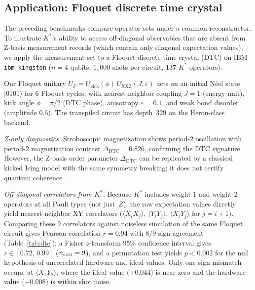 \documentclass[twocolumn,prx,aps,superscriptaddress,longbibliography,floatfix]{revtex4-2}
\begin{document}
\subsection{Application: Floquet discrete time crystal}
\label{sec:dtc}

The preceding benchmarks compare operator sets under a common
reconstructor.
To illustrate $K^*$'s ability to access off-diagonal
observables that are absent from Z-basis measurement records
(which contain only diagonal expectation values),
we apply the measurement set to a
Floquet discrete time crystal (DTC) on IBM
\texttt{ibm\_kingston} ($n = 4$ qubits, $1{,}000$ shots per
circuit, $137$ $K^*$ operators).

Our Floquet unitary $U_F = U_{\mathrm{kick}}(\phi)\,
U_{\mathrm{XXZ}}(J, \varepsilon)$ acts on an initial N\'eel
state $|0101\rangle$ for $6$ Floquet cycles, with nearest-neighbor coupling $J = 1$ (energy unit), kick angle
$\phi = \pi/2$ (DTC phase), anisotropy $\varepsilon = 0.1$,
and weak bond disorder (amplitude $0.5$).  The transpiled circuit
has depth~$329$ on the Heron-class backend.

\emph{Z-only diagnostics.}
Stroboscopic magnetization shows period-$2$ oscillation
with period-$2$ magnetization contrast $\Delta_{\mathrm{DTC}} = 0.826$, confirming the DTC
signature.  However, the Z-basis order parameter
$\Delta_{\mathrm{DTC}}$ can be replicated by a classical
kicked Ising model with the same symmetry breaking;
it does not certify quantum coherence~\cite{Mi2022,Ippoliti2021}.

\emph{Off-diagonal correlators from $K^*$.}
Because $K^*$ includes weight-$1$ and weight-$2$ operators
at all Pauli types (not just~$Z$), the raw expectation
values directly yield nearest-neighbor XY correlators
($\langle X_i X_j\rangle$, $\langle Y_i Y_j\rangle$,
$\langle X_i Y_j\rangle$ for $j = i + 1$).
Comparing these $9$ correlators against noiseless simulation
of the same Floquet circuit gives Pearson correlation
$r = 0.94$ with $8/9$ sign agreement
(Table~\ref{tab:dtc});
a Fisher $z$-transform $95\%$ confidence interval gives
$r \in [0.72,\, 0.99]$ ($n_{\rm corr} = 9$), and a
permutation test yields $p < 0.002$ for the null hypothesis
of uncorrelated hardware and ideal values.
Only one sign mismatch occurs, at
$\langle X_1 Y_2\rangle$, where the ideal value
($+0.044$) is near zero and the hardware value ($-0.008$)
is within shot noise.
\end{document}
